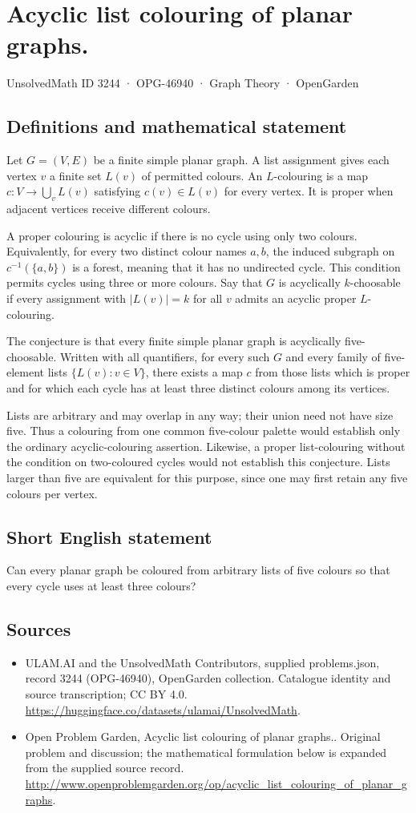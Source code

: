 \documentclass[11pt,a4paper]{article}
\begin{document}
\section*{Acyclic list colouring of planar graphs.}\label{3244}
{\small UnsolvedMath ID 3244 · OPG-46940 · Graph Theory · OpenGarden}
\subsection{Definitions and mathematical statement}
Let $G=(V,E)$ be a finite simple planar graph. A list assignment gives each
vertex $v$ a finite set $L(v)$ of permitted colours. An $L$-colouring is a
map $c:V\to\bigcup_vL(v)$ satisfying $c(v)\in L(v)$ for every vertex.
It is proper when adjacent vertices receive different colours.

A proper colouring is acyclic if there is no cycle using only two colours.
Equivalently, for every two distinct colour names $a,b$, the induced
subgraph on $c^{-1}(\{a,b\})$ is a forest, meaning that it has no
undirected cycle. This condition permits cycles using three or more
colours. Say that $G$ is acyclically $k$-choosable if every assignment with
$|L(v)|=k$ for all $v$ admits an acyclic proper $L$-colouring.

The conjecture is that every finite simple planar graph is acyclically
five-choosable. Written with all quantifiers, for every such $G$ and every
family of five-element lists $\{L(v):v\in V\}$, there exists a map $c$
from those lists which is proper and for which each cycle has at least
three distinct colours among its vertices.

Lists are arbitrary and may overlap in any way; their union need not
have size five. Thus a colouring from one common five-colour palette
would establish only the ordinary acyclic-colouring assertion. Likewise,
a proper list-colouring without the condition on two-coloured cycles
would not establish this conjecture. Lists larger than five are equivalent
for this purpose, since one may first retain any five colours per vertex.
\subsection{Short English statement}
Can every planar graph be coloured from arbitrary lists of five colours so that every cycle uses at least three colours?
\subsection{Sources}
\begin{itemize}
\item[S1] ULAM.AI and the UnsolvedMath Contributors, supplied problems.json, record 3244 (OPG-46940), OpenGarden collection. Catalogue identity and source transcription; CC BY 4.0.
\url{https://huggingface.co/datasets/ulamai/UnsolvedMath}.
\item[S2] Open Problem Garden, Acyclic list colouring of planar graphs.. Original problem and discussion; the mathematical formulation below is expanded from the supplied source record.
\url{http://www.openproblemgarden.org/op/acyclic_list_colouring_of_planar_graphs}.
\end{itemize}
\end{document}
